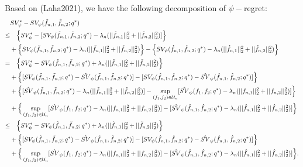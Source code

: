 \documentclass[10pt]{article}
\theoremstyle{remark} \newtheorem{rem}{Remark}
\begin{document}
Based on (Laha2021), we have the following decomposition of $\psi-$regret:
\begin{align}
    &SV_\psi^* - SV_\psi(\hat f_{n,1}, \hat f_{n,2};q^*) \notag\\
    \leq& \quad \Big\{SV_\psi^* - [SV_\psi(\tilde f_{n,1}, \tilde f_{n,2};q^*) - \lambda_n(||\tilde f_{n,1}||_{2}^2+||\tilde f_{n,2}||_{2}^2)]\Big\} \notag\\
    &+ \Big\{SV_\psi(\tilde f_{n,1}, \tilde f_{n,2};q^*) -\lambda_n(||\tilde f_{n,1}||_{2}^2+||\tilde f_{n,2}||_{2}^2)\Big\} - \Big\{SV_\psi(\hat f_{n,1}, \hat f_{n,2};q^*) -\lambda_n(||\hat f_{n,1}||_{2}^2+||\hat f_{n,2}||_{2}^2)\Big\}
    \notag\\
    =&\quad \Big\{SV_\psi^* - SV_\psi(\tilde f_{n,1},\tilde f_{n,2};q^*) + \lambda_n(||\tilde f_{n,1}||_{2}^2+||\tilde f_{n,2}||_{2}^2) \Big\} \notag\\
     &+ \Big\{[SV_\psi(\tilde f_{n,1},\tilde f_{n,2};q^*) - \hat{SV}_\psi(\tilde f_{n,1},\tilde f_{n,2};q^*)] - [SV_\psi(\hat f_{n,1},\hat f_{n,2};q^*) - \hat{SV}_\psi(\hat f_{n,1},\hat f_{n,2};q^*)]\Big\} \notag\\
     &+ \Big\{[\hat{SV}_\psi(\tilde f_{n,1},\tilde f_{n,2};q^*) - \lambda_n(||\tilde f_{n,1}||_{2}^2+||\tilde f_{n,2}||_{2}^2)]- \sup_{(f_1,f_2)\in\mathcal{U}_n}[\hat{SV}_\psi(f_1,f_2;q^*) - \lambda_n(|| f_{n,1}||_{2}^2+||f_{n,2}||_{2}^2)] \Big\}\notag\\
     &+ \Big\{\sup_{(f_1,f_2)\in\mathcal{U}_n}[\hat{SV}_\psi(f_1,f_2;q^*) - \lambda_n(||f_{n,1}||_{2}^2+||f_{n,2}||_{2}^2)] - [\hat{SV}_\psi(\hat f_{n,1},\hat f_{n,2};q^*)-\lambda_n(||\hat f_{n,1}||_{2}^2+||\hat f_{n,2}||_{2}^2)] \Big\} \notag\\
    \leq& \quad \Big\{SV_\psi^* - SV_\psi(\tilde f_{n,1},\tilde f_{n,2};q^*) + \lambda_n(||\tilde f_{n,1}||_{2}^2+||\tilde f_{n,2}||_{2}^2) \Big\} \notag\\
     &+ \Big\{[SV_\psi(\tilde f_{n,1},\tilde f_{n,2};q^*) - \hat{SV}_\psi(\tilde f_{n,1},\tilde f_{n,2};q^*)] - [SV_\psi(\hat f_{n,1},\hat f_{n,2};q^*) - \hat{SV}_\psi(\hat f_{n,1},\hat f_{n,2};q^*)]\Big\} \notag\\
     &+ \Big\{\sup_{(f_1,f_2)\in\mathcal{U}_n}[\hat{SV}_\psi(f_1,f_2;q^*) - \lambda_n(||f_{n,1}||_{2}^2+||f_{n,2}||_{2}^2)] - [\hat{SV}_\psi(\hat f_{n,1},\hat f_{n,2};q^*)-\lambda_n(||\hat f_{n,1}||_{2}^2+||\hat f_{n,2}||_{2}^2)] \Big\}.
    \label{totalerror}
\end{align}
\end{document}
